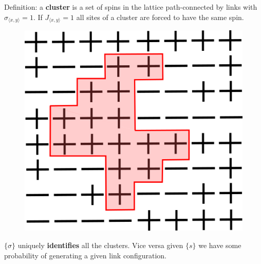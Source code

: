 \documentclass[12pt,handout]{beamer}
\begin{document}
\begin{frame}
\begin{center}

Definition: a \textbf{cluster} is a set of spins in the lattice path-connected by links with $\sigma_{\langle x, y \rangle} = 1$. If $J_{\langle x, y \rangle} = 1$ all sites of a cluster are forced to have the same spin.

\begin{figure}[!htb]
\centering
\includegraphics[scale=0.4]{esempioCluster.png}
\end{figure}

$\lbrace \sigma \rbrace$ uniquely \textbf{identifies} all the clusters. Vice versa given $\lbrace s \rbrace$ we have some probability of generating a given link configuration.
\end{center}
\end{frame}
\end{document}
